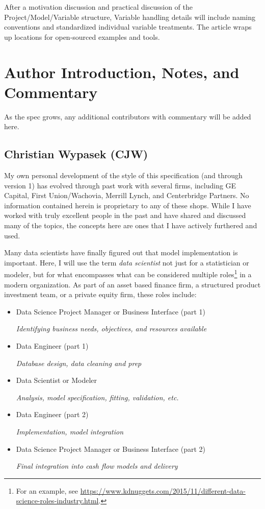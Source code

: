 \documentclass[10pt]{article}
\begin{document}
After a motivation discussion and practical discussion of the Project/Model/Variable structure, Variable handling details will
include naming conventions and standardized individual variable treatments.  The article wraps up locations for open-sourced examples and
tools.

\ifcommentary

\section{Author Introduction, Notes, and Commentary\label{authors}}
As the spec grows, any additional contributors with commentary will be added here.

\subsection{Christian Wypasek (CJW)}

My own personal development of the style of this specification (and through version 1)  has evolved through past work with several firms, 
including GE Capital, First Union/Wachovia, Merrill Lynch, and Centerbridge Partners.   
No information contained herein is proprietary to any of these shops.
While I have worked with truly excellent people in the past and have shared and discussed many of the topics, 
the concepts here are ones that I have actively furthered and used.  

Many data scientists have finally figured out that model implementation is important.  Here, I will
use the term {\em data scientist} not just for a statistician or modeler, but for what encompasses what can be considered 
multiple roles\footnote{For an example, see
\url{https://www.kdnuggets.com/2015/11/different-data-science-roles-industry.html}.
} in a modern
organization.  
As part of an asset based finance firm, a structured product investment team, or a private
equity firm, these roles include:
\begin{itemize}
    \item Data Science Project Manager or Business Interface (part 1)\par
        {\em Identifying business needs, objectives, and resources available}
    \item Data Engineer (part 1)\par
        {\em Database design, data cleaning and prep}
    \item Data Scientist or Modeler\par
        {\em Analysis, model specification, fitting, validation, etc.}
    \item Data Engineer (part 2)\par
        {\em Implementation, model integration}
    \item Data Science Project Manager or Business Interface (part 2)\par
        {\em Final integration into cash flow models and delivery}
\end{itemize}
\end{document}
